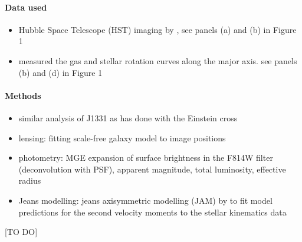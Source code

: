 \paragraph{Data used}
\begin{itemize}
\item Hubble Space Telescope (HST) imaging by \cite{SWELLSI}, see panels (a) and (b) in Figure 1
\item  \citet{SWELLSV} measured the gas and stellar rotation curves along the major axis. see panels (b) and (d) in Figure 1
\end{itemize}

\paragraph{Methods}
\begin{itemize}
\item similar analysis of J1331 as \citet{GlennEC} has done with the Einstein cross
\item lensing: fitting scale-free galaxy model to image positions \citep{EvansWitt}
\item photometry: MGE expansion of surface brightness in the F814W filter (deconvolution with PSF), apparent magnitude, total luminosity, effective radius
\item Jeans modelling: jeans axisymmetric modelling (JAM) by \citet{Cap08} to fit model predictions for the second velocity moments to the stellar kinematics data
\end{itemize}

[TO DO]





